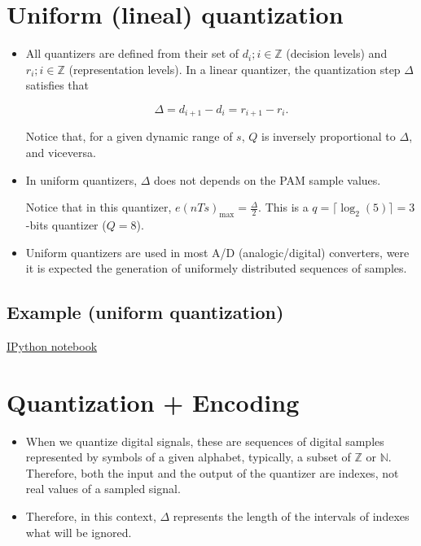 \section{Uniform (lineal) quantization}
\begin{itemize}
\item
  All quantizers are defined from their set of
  \(d_i; i\in {\mathbb{Z}}\) (decision levels) and
  \(r_i; i\in {\mathbb{Z}}\) (representation levels). In a linear
  quantizer, the quantization step \(\Delta\) satisfies that

  \begin{equation}
    \Delta=d_{i+1}-d_i=r_{i+1}-r_i.
  \end{equation}

  Notice that, for a given dynamic range of \(s\), \(Q\) is inversely
  proportional to \(\Delta\), and viceversa.
\item
  In uniform quantizers, \(\Delta\) does not depends on the PAM sample
  values.

  Notice that in this quantizer, \(e(nTs)_\text{max}=\frac{\Delta}{2}\).
  This is a \(q=\lceil\log_2(5)\rceil=3\)-bits quantizer (\(Q=8\)).
\item
  Uniform quantizers are used in most A/D (analogic/digital) converters,
  were it is expected the generation of uniformely distributed sequences
  of samples.
\end{itemize}

\subsection{Example (uniform quantization)}
\href{https://nbviewer.jupyter.org/github/vicente-gonzalez-ruiz/LZW/blob/master/uniform_quantization.ipynb}{IPython notebook}

\section{Quantization + Encoding}
\begin{itemize}
\tightlist
\item
  When we quantize digital signals, these are sequences of digital
  samples represented by symbols of a given alphabet, typically, a
  subset of \({\mathbb{Z}}\) or \({\mathbb{N}}\). Therefore, both the
  input and the output of the quantizer are indexes, not real values of
  a sampled signal.
\item
  Therefore, in this context, \(\Delta\) represents the length of the
  intervals of indexes what will be ignored.
\end{itemize}

